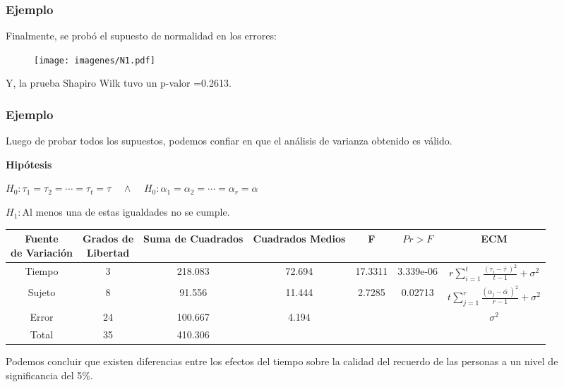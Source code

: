 \documentclass[12pt]{beamer}
\begin{document}
\begin{frame}
\frametitle{Ejemplo}
Finalmente, se probó el supuesto de normalidad en los errores:
\begin{figure}[h!]
  \centering
  \texttt{[image: imagenes/N1.pdf]}
\end{figure}
Y, la prueba Shapiro Wilk tuvo un p-valor =0.2613.
\end{frame}

\begin{frame}
\frametitle{Ejemplo}
Luego de probar todos los supuestos, podemos confiar en que el análisis de varianza obtenido es válido.

\textbf{Hipótesis}
\begin{center}
$H_0:\tau_1=\tau_2=\cdots=\tau_t=\tau \;\;\;\; \wedge \;\;\;\; H_0:\alpha_1=\alpha_2=\cdots=\alpha_r=\alpha $

$H_1:$Al menos una de estas igualdades no se cumple.
\end{center}
\begin{table}[htbp]
  \centering
\resizebox{12cm}{!} {
\begin{tabular}{|c|c|c|c|c|c|c|}
\hline 
\parbox{7em}{\centering Fuente\\ de Variación} & \parbox{7em}{\centering Grados de\\ Libertad} & Suma de Cuadrados & Cuadrados Medios & F & $Pr>F$ & ECM \\ 
\hline 
Tiempo & 3 & 218.083 & 72.694 & 17.3311 & 3.339e-06  & $r\sum\limits_{i=1}^{t}\frac{(\tau_i-\bar{\tau_{.}})^2}{t-1}+\sigma^2$\\ 
Sujeto & 8 & 91.556 & 11.444 & 2.7285 & 0.02713 &$t\sum\limits_{j=1}^{r}\frac{(\alpha_{j}-\bar{\alpha_{.}})^2}{r-1}+\sigma^2$ \\
Error & 24 & 100.667 & 4.194 &   & & $\sigma^2$\\ 
Total & 35 & 410.306 &  &   & &\\ 
\hline 
\end{tabular} 
}
\label{tab:addlabel}%
\end{table}%
Podemos concluir que existen diferencias entre los efectos del tiempo sobre la calidad del recuerdo de las personas a un nivel de
significancia del 5\%.
\end{frame}
\end{document}
